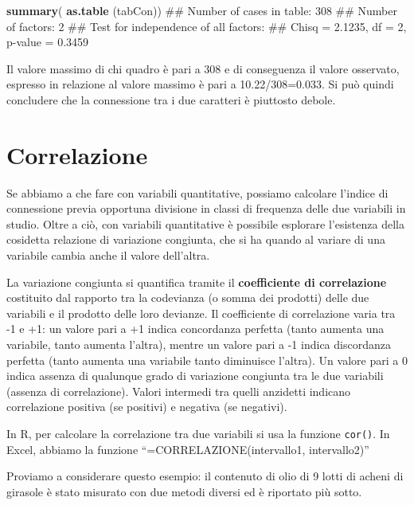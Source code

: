 \documentclass[a4paper,12pt,oneside]{book}
\newenvironment{Shaded}{\begin{snugshade}}{\end{snugshade}}
\newcommand{\KeywordTok}[1]{\textcolor[rgb]{0.13,0.29,0.53}{\textbf{#1}}}
\newcommand{\NormalTok}[1]{#1}
\theoremstyle{definition}
\theoremstyle{definition}
\theoremstyle{definition}
\theoremstyle{remark}
\begin{document}
\begin{Shaded}
\begin{Highlighting}[]
\KeywordTok{summary}\NormalTok{( }\KeywordTok{as.table}\NormalTok{ (tabCon))}
\NormalTok{## Number of cases in table: 308 }
\NormalTok{## Number of factors: 2 }
\NormalTok{## Test for independence of all factors:}
\NormalTok{##  Chisq = 2.1235, df = 2, p-value = 0.3459}
\end{Highlighting}
\end{Shaded}

Il valore massimo di chi quadro è pari a 308 e di conseguenza il valore
osservato, espresso in relazione al valore massimo è pari a
10.22/308=0.033. Si può quindi concludere che la connessione tra i due
caratteri è piuttosto debole.

\section*{Correlazione}\label{correlazione}

Se abbiamo a che fare con variabili quantitative, possiamo calcolare
l'indice di connessione previa opportuna divisione in classi di
frequenza delle due variabili in studio. Oltre a ciò, con variabili
quantitative è possibile esplorare l'esistenza della cosidetta relazione
di variazione congiunta, che si ha quando al variare di una variabile
cambia anche il valore dell'altra.

La variazione congiunta si quantifica tramite il \textbf{coefficiente di
correlazione} costituito dal rapporto tra la codevianza (o somma dei
prodotti) delle due variabili e il prodotto delle loro devianze. Il
coefficiente di correlazione varia tra -1 e +1: un valore pari a +1
indica concordanza perfetta (tanto aumenta una variabile, tanto aumenta
l'altra), mentre un valore pari a -1 indica discordanza perfetta (tanto
aumenta una variabile tanto diminuisce l'altra). Un valore pari a 0
indica assenza di qualunque grado di variazione congiunta tra le due
variabili (assenza di correlazione). Valori intermedi tra quelli
anzidetti indicano correlazione positiva (se positivi) e negativa (se
negativi).

In R, per calcolare la correlazione tra due variabili si usa la funzione
\texttt{cor()}. In Excel, abbiamo la funzione
``=CORRELAZIONE(intervallo1, intervallo2)''

Proviamo a considerare questo esempio: il contenuto di olio di 9 lotti
di acheni di girasole è stato misurato con due metodi diversi ed è
riportato più sotto.
\end{document}
